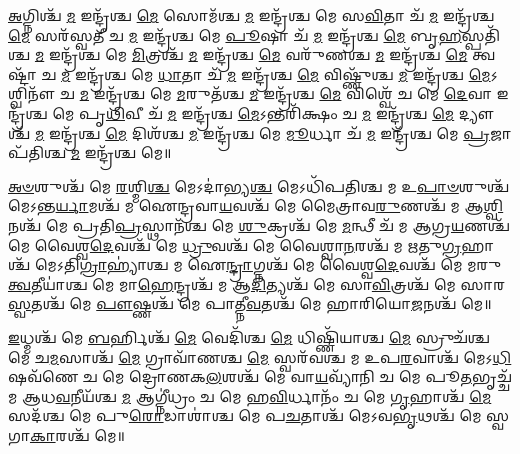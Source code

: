 
\-\ul{𑌅}\-𑌗𑍍𑌨𑌿𑌶𑍍𑌚᳴ \ul{𑌮} 𑌇𑌨𑍍𑌦𑍍𑌰᳴𑌶𑍍𑌚 \ul{𑌮𑍇} 𑌸𑍋𑌮᳴𑌶𑍍𑌚 \ul{𑌮} 𑌇𑌨𑍍𑌦𑍍𑌰᳴𑌶𑍍𑌚 𑌮𑍇 𑌸\-\ul{𑌵𑌿}\-𑌤𑌾 𑌚᳴ \ul{𑌮} 𑌇𑌨𑍍𑌦𑍍𑌰᳴𑌶𑍍𑌚 \ul{𑌮𑍇} 𑌸𑌰᳴𑌸𑍍𑌵𑌤𑍀 𑌚 \ul{𑌮} 𑌇𑌨𑍍𑌦𑍍𑌰᳴𑌶𑍍𑌚 𑌮𑍇 \ul{𑌪𑍂}\-𑌷𑌾 𑌚᳴ \ul{𑌮} 𑌇𑌨𑍍𑌦𑍍𑌰᳴𑌶𑍍𑌚 \ul{𑌮𑍇} 𑌬𑍃\-\ul{𑌹}\-𑌸𑍍𑌪𑌤𑌿᳴𑌶𑍍𑌚 \ul{𑌮} 𑌇𑌨𑍍𑌦𑍍𑌰᳴𑌶𑍍𑌚 𑌮𑍇 \ul{𑌮𑌿}\-𑌤𑍍𑌰𑌶𑍍𑌚᳴ \ul{𑌮} 𑌇𑌨𑍍𑌦𑍍𑌰᳴𑌶𑍍𑌚 \ul{𑌮𑍇} 𑌵𑌰𑍁᳴𑌣𑌶𑍍𑌚 \ul{𑌮} 𑌇𑌨𑍍𑌦𑍍𑌰᳴𑌶𑍍𑌚 \ul{𑌮𑍇} 𑌤𑍍𑌵𑌷𑍍𑌟𑌾᳴ 𑌚 \ul{𑌮} 𑌇𑌨𑍍𑌦𑍍𑌰᳴𑌶𑍍𑌚 𑌮𑍇 \ul{𑌧𑌾}\-𑌤𑌾 𑌚᳴ \ul{𑌮} 𑌇𑌨𑍍𑌦𑍍𑌰᳴𑌶𑍍𑌚 \ul{𑌮𑍇} 𑌵𑌿𑌷𑍍𑌣𑍁᳴𑌶𑍍𑌚 \ul{𑌮} 𑌇𑌨𑍍𑌦𑍍𑌰᳴𑌶𑍍𑌚 \ul{𑌮𑍇}\-𑌽𑌶𑍍𑌵𑌿𑌨𑍗᳴ 𑌚 \ul{𑌮} 𑌇𑌨𑍍𑌦𑍍𑌰᳴𑌶𑍍𑌚 𑌮𑍇 \ul{𑌮}\-𑌰𑍁𑌤᳴𑌶𑍍𑌚 \ul{𑌮} 𑌇𑌨𑍍𑌦𑍍𑌰᳴𑌶𑍍𑌚 \ul{𑌮𑍇} 𑌵𑌿𑌶𑍍𑌵𑍇᳴ 𑌚 𑌮𑍇 \ul{𑌦𑍇}\-𑌵𑌾 𑌇𑌨𑍍𑌦𑍍𑌰᳴𑌶𑍍𑌚 𑌮𑍇 𑌪𑍃\-\ul{𑌥𑌿}\-𑌵𑍀 𑌚᳴ \ul{𑌮} 𑌇𑌨𑍍𑌦𑍍𑌰᳴𑌶𑍍𑌚 \ul{𑌮𑍇}\-𑌽𑌨𑍍𑌤𑌰𑌿᳴𑌕𑍍𑌷𑌂 𑌚 \ul{𑌮} 𑌇𑌨𑍍𑌦𑍍𑌰᳴𑌶𑍍𑌚 \ul{𑌮𑍇} 𑌦𑍍𑌯𑍗𑌶𑍍𑌚᳴ \ul{𑌮} 𑌇𑌨𑍍𑌦𑍍𑌰᳴𑌶𑍍𑌚 \ul{𑌮𑍇} 𑌦𑌿𑌶᳴𑌶𑍍𑌚 \ul{𑌮} 𑌇𑌨𑍍𑌦𑍍𑌰᳴𑌶𑍍𑌚 𑌮𑍇 \ul{𑌮𑍂}\-𑌰𑍍𑌧𑌾 𑌚᳴ \ul{𑌮} 𑌇𑌨𑍍𑌦𑍍𑌰᳴𑌶𑍍𑌚 𑌮𑍇 \ul{𑌪𑍍𑌰}\-𑌜𑌾𑌪᳴𑌤𑌿𑌶𑍍𑌚 \ul{𑌮} 𑌇𑌨𑍍𑌦𑍍𑌰᳴𑌶𑍍𑌚 𑌮𑍇॥


\-\ul{𑌅}\-\-\ul{𑍞}\-𑌶𑍁𑌶𑍍𑌚᳴ 𑌮𑍇 \ul{𑌰}\-𑌶𑍍𑌮𑌿\-\ul{𑌶𑍍𑌚} 𑌮𑍇𑌽𑌦𑌾॑𑌭𑍍𑌯\-\ul{𑌶𑍍𑌚} 𑌮𑍇𑌽𑌧𑌿᳴𑌪𑌤𑌿𑌶𑍍𑌚 𑌮 𑌉\-\ul{𑌪𑌾}\-\-\ul{𑍞}\-𑌶𑍁𑌶𑍍𑌚᳴ 𑌮𑍇𑌽𑌨𑍍𑌤\-\ul{𑌰𑍍𑌯𑌾}\-𑌮𑌶𑍍𑌚᳴ 𑌮 𑌐𑌨𑍍𑌦𑍍𑌰𑌵𑌾\-\ul{𑌯}\-𑌵𑌶𑍍𑌚᳴ 𑌮𑍇 𑌮𑍈𑌤𑍍𑌰𑌾𑌵\-\ul{𑌰𑍁}\-𑌣𑌶𑍍𑌚᳴ 𑌮 𑌆\-\ul{𑌶𑍍𑌵𑌿}\-𑌨𑌶𑍍𑌚᳴ 𑌮𑍇 𑌪𑍍𑌰𑌤𑌿\-\ul{𑌪𑍍𑌰}\-𑌸𑍍𑌥𑌾𑌨᳴𑌶𑍍𑌚 𑌮𑍇 \ul{𑌶𑍁}\-𑌕𑍍𑌰𑌶𑍍𑌚᳴ 𑌮𑍇 \ul{𑌮}\-𑌨𑍍𑌥𑍀 𑌚᳴ 𑌮 𑌆𑌗𑍍𑌰\-\ul{𑌯}\-𑌣𑌶𑍍𑌚᳴ 𑌮𑍇 𑌵𑍈𑌶𑍍𑌵\-\ul{𑌦𑍇}\-𑌵𑌶𑍍𑌚᳴ 𑌮𑍇 \ul{𑌧𑍍𑌰𑍁}\-𑌵𑌶𑍍𑌚᳴ 𑌮𑍇 𑌵𑍈𑌶𑍍𑌵𑌾\-\ul{𑌨}\-𑌰𑌶𑍍𑌚᳴ 𑌮 𑌋𑌤𑍁\-\ul{𑌗𑍍𑌰}\-𑌹𑌾𑌶𑍍𑌚᳴ 𑌮𑍇𑌽𑌤𑌿\-\ul{𑌗𑍍𑌰𑌾}\-𑌹𑍍𑌯𑌾॑𑌶𑍍𑌚 𑌮 𑌐\-\ul{𑌨𑍍𑌦𑍍𑌰𑌾}\-𑌗𑍍𑌨𑌶𑍍𑌚᳴ 𑌮𑍇 𑌵𑍈𑌶𑍍𑌵\-\ul{𑌦𑍇}\-𑌵𑌶𑍍𑌚᳴ 𑌮𑍇 𑌮𑌰𑍁\-\ul{𑌤𑍍𑌵}\-𑌤𑍀𑌯𑌾॑𑌶𑍍𑌚 𑌮𑍇 𑌮𑌾\-\ul{𑌹𑍇}\-𑌨𑍍𑌦𑍍𑌰𑌶𑍍𑌚᳴ 𑌮 𑌆\-\ul{𑌦𑌿}\-𑌤𑍍𑌯𑌶𑍍𑌚᳴ 𑌮𑍇 𑌸𑌾\-\ul{𑌵𑌿}\-𑌤𑍍𑌰𑌶𑍍𑌚᳴ 𑌮𑍇 𑌸𑌾𑌰\-\ul{𑌸𑍍𑌵}\-𑌤𑌶𑍍𑌚᳴ 𑌮𑍇 \ul{𑌪𑍗}\-𑌷𑍍𑌣𑌶𑍍𑌚᳴ 𑌮𑍇 𑌪𑌾𑌤𑍍𑌨𑍀\-\ul{𑌵}\-𑌤𑌶𑍍𑌚᳴ 𑌮𑍇 𑌹𑌾𑌰𑌿𑌯𑍋\-\ul{𑌜}\-𑌨𑌶𑍍𑌚᳴ 𑌮𑍇॥ 


\-\ul{𑌇}\-𑌧𑍍𑌮𑌶𑍍𑌚᳴ 𑌮𑍇 \ul{𑌬}\-𑌰𑍍𑌹𑌿𑌶𑍍𑌚᳴ \ul{𑌮𑍇} 𑌵𑍇𑌦𑌿᳴𑌶𑍍𑌚 \ul{𑌮𑍇} 𑌧𑌿𑌷𑍍𑌣𑌿᳴𑌯𑌾𑌶𑍍𑌚 \ul{𑌮𑍇} 𑌸𑍍𑌰𑍁𑌚᳴𑌶𑍍𑌚 𑌮𑍇 𑌚\-\ul{𑌮}\-𑌸𑌾𑌶𑍍𑌚᳴ \ul{𑌮𑍇} 𑌗𑍍𑌰𑌾𑌵𑌾᳴𑌣𑌶𑍍𑌚 \ul{𑌮𑍇} 𑌸𑍍𑌵𑌰᳴𑌵𑌶𑍍𑌚 𑌮 𑌉𑌪\-\ul{𑌰}\-𑌵𑌾𑌶𑍍𑌚᳴ 𑌮𑍇𑌽\-\ul{𑌧𑌿}\-𑌷𑌵᳴𑌣𑍇 𑌚 𑌮𑍇 𑌦𑍍𑌰𑍋𑌣𑌕\-\ul{𑌲}\-𑌶𑌶𑍍𑌚᳴ 𑌮𑍇 𑌵𑌾\-\ul{𑌯}\-𑌵𑍍𑌯𑌾᳴𑌨𑌿 𑌚 𑌮𑍇 𑌪𑍂\-\ul{𑌤}\-𑌭𑍃𑌚𑍍𑌚᳴ 𑌮 𑌆𑌧\-\ul{𑌵}\-𑌨𑍀𑌯᳴𑌶𑍍𑌚 \ul{𑌮} 𑌆𑌗𑍍𑌨𑍀॑𑌧𑍍𑌰𑌂 𑌚 𑌮𑍇 𑌹\-\ul{𑌵𑌿}\-𑌰𑍍𑌧𑌾𑌨𑌂᳴ 𑌚 𑌮𑍇 \ul{𑌗𑍃}\-𑌹𑌾𑌶𑍍𑌚᳴ \ul{𑌮𑍇} 𑌸𑌦᳴𑌶𑍍𑌚 𑌮𑍇 𑌪𑍁\-\ul{𑌰𑍋}\-𑌡𑌾𑌶𑌾॑𑌶𑍍𑌚 𑌮𑍇 𑌪\-\ul{𑌚}\-𑌤𑌾𑌶𑍍𑌚᳴ 𑌮𑍇𑌽𑌵\-\ul{𑌭𑍃}\-𑌥𑌶𑍍𑌚᳴ 𑌮𑍇 𑌸𑍍𑌵𑌗𑌾\-\ul{𑌕𑌾}\-𑌰𑌶𑍍𑌚᳴ 𑌮𑍇॥ 

